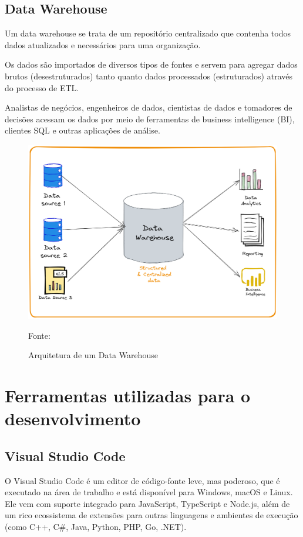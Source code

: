 \subsection{Data Warehouse}

Um data warehouse se trata de um repositório centralizado que contenha todos dados atualizados e necessários para uma organização.

Os dados são importados de diversos tipos de fontes e servem para agregar dados brutos (desestruturados) tanto quanto dados processados (estruturados) através do processo de ETL.\cite{talent500_dwdm}

Analistas de negócios, engenheiros de dados, cientistas de dados e tomadores de decisões acessam os dados por meio de ferramentas de business intelligence (BI), clientes SQL e outras aplicações de análise.

\begin{figure}[H]
  \centering
  \caption{Arquitetura de um Data Warehouse}\label{fig:datawarehouse}
  \includegraphics[width=.6\linewidth]{imagens/datawarehouse.png}
  \par
  \footnotesize{Fonte:\cite{aws_dwh}}
\end{figure}

\section{Ferramentas utilizadas para o desenvolvimento}
\subsection{Visual Studio Code}

O Visual Studio Code é um editor de código-fonte leve, mas poderoso, que é executado na área de trabalho e está disponível para Windows, macOS e Linux. Ele vem com suporte integrado para JavaScript, TypeScript e Node.js, além de um rico ecossistema de extensões para outras linguagens e ambientes de execução (como C++, C\#, Java, Python, PHP, Go, .NET).\cite{microsoft_vs}

